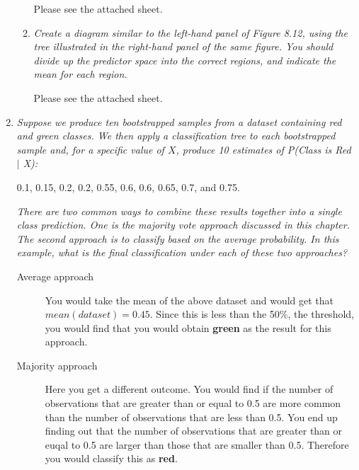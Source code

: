 \documentclass[12pt]{article}
\begin{document}
\begin{enumerate}
\begin{enumerate}
			    Please see the attached sheet. 
			    
			\item \emph{Create a diagram similar to the left-hand panel of Figure 8.12, using the tree illustrated in the right-hand panel of the same figure. You should divide up the predictor space into the correct regions, and indicate the mean for each region.}

			    Please see the attached sheet. 

			
		\end{enumerate}
    
    \item \emph{Suppose we produce ten bootstrapped samples from a dataset containing red and green classes. We then apply a classification tree to each bootstrapped sample and, for a specific value of $X$, produce 10 estimates of P(Class is Red $|$ X):}
    
    		\begin{center}
				0.1, 0.15, 0.2, 0.2, 0.55, 0.6, 0.6, 0.65, 0.7, and 0.75.
			\end{center}

\emph{There are two common ways to combine these results together into a single class prediction. One is the majority vote approach discussed in this chapter. The second approach is to classify based on the average probability. In this example, what is the final classification under each of these two approaches?}
    
    \begin{description}
        \item[Average approach] You would take the mean of the above dataset and would get that $mean(dataset) = 0.45$. Since this is less than the 50\%, the threshold, you would find that you would obtain \textbf{green} as the result for this approach.
		\item[Majority approach]	 Here you get a different outcome. You would find if the number of observations that are greater than or equal to 0.5 are more common than the number of observations that are less than 0.5. You end up finding out that the number of observations that are greater than or euqal to 0.5 are larger than those that are smaller than 0.5. Therefore you would classify this as \textbf{red}.
	\end{description}

\end{enumerate}
\end{document}
